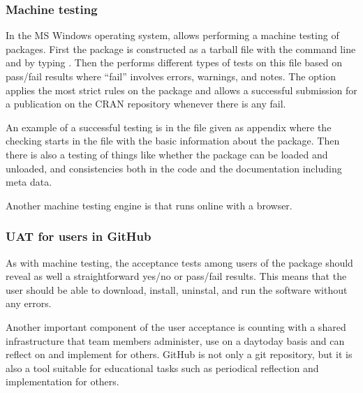 \documentclass[a4paper,12pt,english]{sphinxhowto}
\begin{document}
\subsubsection{Machine testing}
\label{\detokenize{UAT:machine-testing}}
In the MS Windows operating system, 
allows performing a machine testing of  packages. First the package is constructed as a
tarball file with the command line and by typing . Then the
 performs different types of tests on this file based on pass/fail
results where “fail” involves errors, warnings, and notes. The option
 applies the most strict rules on the package and allows a
successful submission for a publication on the CRAN repository whenever
there is any fail.

An example of a successful testing is in the  file given as
appendix where the checking starts in the  file with the
basic information about the package. Then there is also a testing of
things like whether the package can be loaded and unloaded, and
consistencies both in the code and the documentation including meta
data.

Another machine testing engine is  that runs online with a browser.



\subsubsection{UAT for users in GitHub}
\label{\detokenize{UAT:uat-for-users-in-github}}
As with machine testing, the acceptance tests among users of the
 package should reveal as well a
straightforward yes/no or pass/fail results. This means that the user
should be able to download, install, uninstal, and run the software
without any errors.

Another important component of the user acceptance is counting with a
shared infrastructure that team members administer, use on a day\sphinxhyphen{}to\sphinxhyphen{}day
basis and can reflect on and implement for others. GitHub is not only a
git repository, but it is also a tool suitable for educational tasks
such as periodical reflection and implementation for others.
\end{document}
